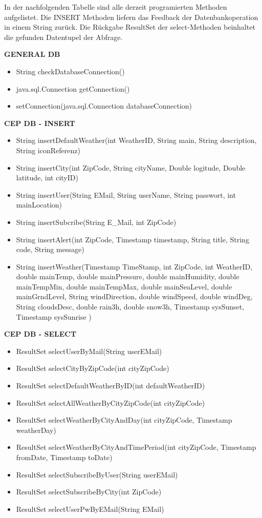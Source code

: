 In der nachfolgenden Tabelle sind alle derzeit programierten Methoden aufgelistet.
Die INSERT  Methoden liefern das Feedback der Datenbankoperation in einem String zurück. Die Rückgabe ResultSet der select-Methoden beinhaltet die gefunden Datentupel der Abfrage.

{\bf GENERAL DB}
\begin{itemize}
\item String  checkDatabaseConnection()
\item java.sql.Connection getConnection()
\item setConnection(java.sql.Connection  databaseConnection)
\end{itemize}

{\bf CEP DB - INSERT}
\begin{itemize}
\item String insertDefaultWeather(int WeatherID, String main, String description, String iconReferenz)
\item String insertCity(int ZipCode, String cityName, Double logitude, Double latitude, int cityID)
\item String insertUser(String EMail, String userName, String passwort, int mainLocation)
\item String insertSubcribe(String E_Mail, int ZipCode)
\item String insertAlert(int ZipCode, Timestamp timestamp, String title, String code, String message)
\item String insertWeather(Timestamp TimeStamp, int ZipCode, int WeatherID, 
				double mainTemp, double mainPressure, double mainHumidity, double mainTempMin,
				double mainTempMax, double mainSeaLevel, double mainGrndLevel,
				String windDirection, double windSpeed, double windDeg, String cloudsDesc, double rain3h, 
				double snow3h, 
				Timestamp sysSunset, Timestamp sysSunrise
				)
\end{itemize}

{\bf CEP DB - SELECT }
\begin{itemize}
\item ResultSet selectUserByMail(String userEMail)
\item ResultSet selectCityByZipCode(int cityZipCode)
\item ResultSet selectDefaultWeatherByID(int defaultWeatherID)
\item ResultSet selectAllWeatherByCityZipCode(int cityZipCode)
\item ResultSet selectWeatherByCityAndDay(int cityZipCode, Timestamp weatherDay)
\item ResultSet selectWeatherByCityAndTimePeriod(int cityZipCode, Timestamp fromDate, Timestamp toDate) 
\item ResultSet selectSubscribeByUser(String userEMail)
\item ResultSet selectSubscribeByCity(int ZipCode)
\item ResultSet selectUserPwByEMail(String EMail)
\end{itemize}

